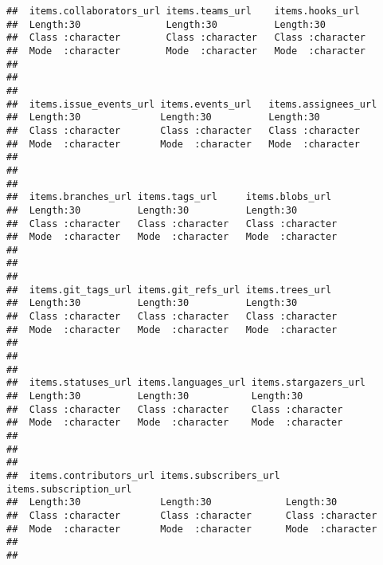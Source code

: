 \documentclass{article}\usepackage[]{graphicx}\usepackage[]{color}
\makeatletter
\newenvironment{kframe}{%
 \def\at@end@of@kframe{}%
 \ifinner\ifhmode%
  \def\at@end@of@kframe{\end{minipage}}%
  \begin{minipage}{\columnwidth}%
 \fi\fi%
 \def\FrameCommand##1{\hskip\@totalleftmargin \hskip-\fboxsep
 \colorbox{shadecolor}{##1}\hskip-\fboxsep
     \hskip-\linewidth \hskip-\@totalleftmargin \hskip\columnwidth}%
 \MakeFramed {\advance\hsize-\width
   \@totalleftmargin\z@ \linewidth\hsize
   \@setminipage}}%
 {\par\unskip\endMakeFramed%
 \at@end@of@kframe}
\newenvironment{knitrout}{}{} %
\makeatother
\begin{document}
\begin{knitrout}
\begin{kframe}
\begin{verbatim}
##  items.collaborators_url items.teams_url    items.hooks_url   
##  Length:30               Length:30          Length:30         
##  Class :character        Class :character   Class :character  
##  Mode  :character        Mode  :character   Mode  :character  
##                                                               
##                                                               
##                                                               
##  items.issue_events_url items.events_url   items.assignees_url
##  Length:30              Length:30          Length:30          
##  Class :character       Class :character   Class :character   
##  Mode  :character       Mode  :character   Mode  :character   
##                                                               
##                                                               
##                                                               
##  items.branches_url items.tags_url     items.blobs_url   
##  Length:30          Length:30          Length:30         
##  Class :character   Class :character   Class :character  
##  Mode  :character   Mode  :character   Mode  :character  
##                                                          
##                                                          
##                                                          
##  items.git_tags_url items.git_refs_url items.trees_url   
##  Length:30          Length:30          Length:30         
##  Class :character   Class :character   Class :character  
##  Mode  :character   Mode  :character   Mode  :character  
##                                                          
##                                                          
##                                                          
##  items.statuses_url items.languages_url items.stargazers_url
##  Length:30          Length:30           Length:30           
##  Class :character   Class :character    Class :character    
##  Mode  :character   Mode  :character    Mode  :character    
##                                                             
##                                                             
##                                                             
##  items.contributors_url items.subscribers_url items.subscription_url
##  Length:30              Length:30             Length:30             
##  Class :character       Class :character      Class :character      
##  Mode  :character       Mode  :character      Mode  :character      
##                                                                     
##                                                                     

\end{verbatim}
\end{kframe}
\end{knitrout}
\end{document}

